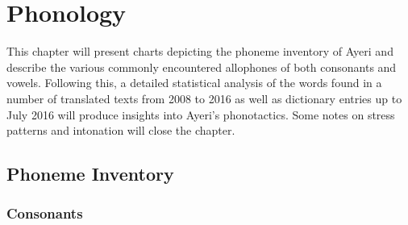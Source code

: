 \chapter{Phonology}

This chapter will present charts depicting the phoneme inventory of Ayeri and 
describe the various commonly encountered allophones of both consonants and 
vowels. Following this, a detailed statistical analysis of the words found in a 
number of translated texts from 2008 to 2016 as well as dictionary entries up 
to July 2016 will produce insights into Ayeri's phonotactics. Some notes on 
stress patterns and intonation will close the chapter.

\section{Phoneme Inventory}

\subsection{Consonants}

